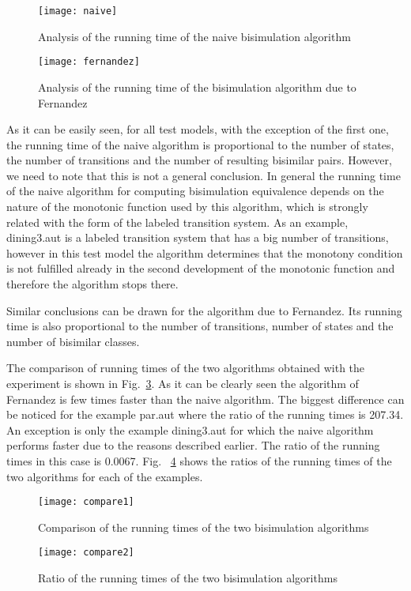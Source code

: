 \begin{figure}[h]
\centering
\texttt{[image: naive]}
\caption{Analysis of the running time of the naive bisimulation algorithm}
\label{fig:naiveAnalysis}
\end{figure}

\begin{figure}[h]
\centering
\texttt{[image: fernandez]}
\caption{Analysis of the running time of the bisimulation algorithm due to Fernandez}
\label{fig:fernandezAnalysis}
\end{figure}

As it can be easily seen, for all test models, with the exception of the first one, the running time of the naive algorithm is proportional to the number of states, the number of transitions and the number of resulting bisimilar pairs. However, we need to note that this is not a general conclusion. In general the running time of the naive algorithm for computing bisimulation equivalence depends on the nature of the monotonic function used by this algorithm, which is strongly related with the form of the labeled transition system. As an example, dining3.aut is a labeled transition system that has a big number of transitions, however in this test model the algorithm determines that the monotony condition is not fulfilled already in the second development of the monotonic function and therefore the algorithm stops there.

Similar conclusions can be drawn for the algorithm due to Fernandez. Its running time is also proportional to the number of transitions, number of states and the number of bisimilar classes. 

The comparison of running times of the two algorithms obtained with the experiment is shown in Fig.~\ref{fig:comparison1}. As it can be clearly seen the algorithm of Fernandez is few times faster than the naive algorithm. The biggest difference can be noticed for the example par.aut where the ratio of the running times is 207.34. An exception is only the example dining3.aut for which the naive algorithm performs faster due to the reasons described earlier. The ratio of the running times in this case is 0.0067. Fig.~ \ref{fig:comparison2} shows the ratios of the running times of the two algorithms for each of the examples.

\begin{figure}[h]
\centering
\texttt{[image: compare1]}
\caption{Comparison of the running times of the two bisimulation algorithms}
\label{fig:comparison1}
\end{figure}

\begin{figure}[h]
\centering
\texttt{[image: compare2]}
\caption{Ratio of the running times of the two bisimulation algorithms}
\label{fig:comparison2}
\end{figure}